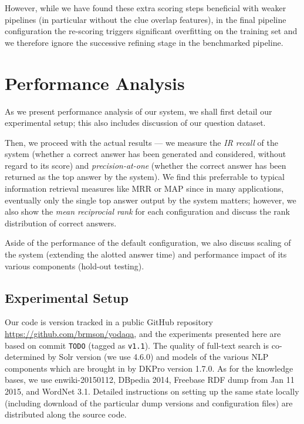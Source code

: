 However, while we have found these extra scoring steps beneficial with
weaker pipelines (in particular without the clue overlap features),
in the final pipeline configuration the re-scoring triggers significant
overfitting on the training set and we therefore ignore
the successive refining stage in the benchmarked pipeline.


\section{Performance Analysis}
\label{sec:results}

As we present performance analysis of our system,
we shall first detail our experimental setup;
this also includes discussion of our question dataset.

Then, we proceed with the actual results --- we measure the \textit{IR recall}
of the system (whether a correct answer has been generated and considered,
without regard to its score) and \textit{precision-at-one} (whether the
correct answer has been returned as the top answer by the system).
We find this preferrable to typical information retrieval measures like MRR or MAP
since in many applications, eventually only the single top answer output by the system
matters; however, we also show the \textit{mean reciprocial rank}
for each configuration and discuss the rank distribution of correct answers.

Aside of the performance of the default configuration, we also discuss
scaling of the system (extending the alotted answer time) and performance
impact of its various components (hold-out testing).

\subsection{Experimental Setup}

Our code is version tracked in a public GitHub repository
\url{https://github.com/brmson/yodaqa}, and the experiments presented
here are based on commit \texttt{TODO} (tagged as \texttt{v1.1}).
The quality of full-text search is co-determined by Solr version
(we use 4.6.0) and models of the various NLP components which are brought
in by DKPro version 1.7.0.
As for the knowledge bases, we use enwiki-20150112, DBpedia 2014,
Freebase RDF dump from Jan 11 2015, and WordNet 3.1.
Detailed instructions on setting up the same state locally (including
download of the particular dump versions and configuration files) are
distributed along the source code.


